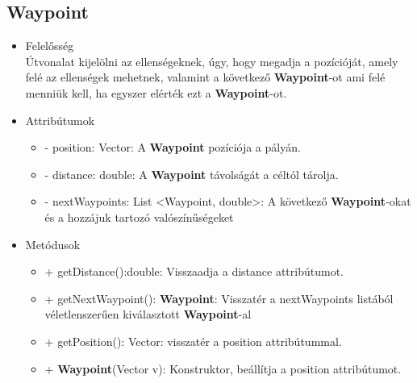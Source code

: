 \subsection{Waypoint}
\begin{itemize}
\item Felelősség\\
Útvonalat kijelölni az ellenségeknek, úgy, hogy megadja a pozícióját, amely felé az ellenségek mehetnek, valamint a következő  \textbf{Waypoint}-ot ami felé menniük kell, ha egyszer elérték ezt a  \textbf{Waypoint}-ot.
\item Attribútumok
	\begin{itemize}
		\item - position: Vector: A \textbf{Waypoint} pozíciója a pályán.
		\item - distance: double: A  \textbf{Waypoint} távolságát a céltól tárolja.
		\item - nextWaypoints: List <Waypoint, double>: A következő  \textbf{Waypoint}-okat és a hozzájuk tartozó valószínűségeket
	\end{itemize}
\item Metódusok
	\begin{itemize}
		\item + getDistance():double: Visszaadja a distance attribútumot.
		\item + getNextWaypoint(): \textbf{Waypoint}: Visszatér a nextWaypoints listából véletlenszerűen kiválasztott \textbf{Waypoint}-al
		\item + getPosition(): Vector: visszatér a position attribútummal.
		\item + \textbf{Waypoint}(Vector v): Konstruktor, beállítja a position attribútumot.
	\end{itemize}
\end{itemize}

